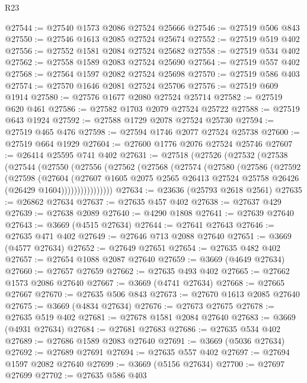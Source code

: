 \begin{lexlean}{R23}
\begin{coremodule}
@27544 := @27540 @1573 @2086 @27524 @25666
@27546 := @27519 @506 @843
@27550 := @27546 @1613 @2085 @27524 @25674
@27552 := @27519 @519 @402
@27556 := @27552 @1581 @2084 @27524 @25682
@27558 := @27519 @534 @402
@27562 := @27558 @1589 @2083 @27524 @25690
@27564 := @27519 @557 @402
@27568 := @27564 @1597 @2082 @27524 @25698
@27570 := @27519 @586 @403
@27574 := @27570 @1646 @2081 @27524 @25706
@27576 := @27519 @609 @1914
@27580 := @27576 @1677 @2080 @27524 @25714
@27582 := @27519 @620 @461
@27586 := @27582 @1703 @2079 @27524 @25722
@27588 := @27519 @643 @1924
@27592 := @27588 @1729 @2078 @27524 @25730
@27594 := @27519 @465 @476
@27598 := @27594 @1746 @2077 @27524 @25738
@27600 := @27519 @664 @1929
@27604 := @27600 @1776 @2076 @27524 @25746
@27607 := @26414 @25595 @741 @402
@27631 := @27518
    (@27526
      (@27532
        (@27538
          (@27544
            (@27550
              (@27556
                (@27562
                  (@27568
                    (@27574
                      (@27580
                        (@27586
                          (@27592
                            (@27598
                              (@27604
                                (@27607
                                  @1605
                                  @2075
                                  @2565
                                  @26413
                                  @27524
                                  @25758
                                  @26426
                                  (@26429 @1604))))))))))))))))
@27634 := @23636 (@25793 @2618 @2561)
@27635 := @26862 @27634
@27637 := @27635 @457 @402
@27638 := @27637 @429
@27639 := @27638 @2089
@27640 := @4290 @1808
@27641 := @27639 @27640
@27643 := @3669 (@4515 @27634)
@27644 := @27641 @27643
@27646 := @27635 @471 @402
@27649 := @27646 @713 @2088 @27640
@27651 := @3669 (@4577 @27634)
@27652 := @27649 @27651
@27654 := @27635 @482 @402
@27657 := @27654 @1088 @2087 @27640
@27659 := @3669 (@4649 @27634)
@27660 := @27657 @27659
@27662 := @27635 @493 @402
@27665 := @27662 @1573 @2086 @27640
@27667 := @3669 (@4741 @27634)
@27668 := @27665 @27667
@27670 := @27635 @506 @843
@27673 := @27670 @1613 @2085 @27640
@27675 := @3669 (@4834 @27634)
@27676 := @27673 @27675
@27678 := @27635 @519 @402
@27681 := @27678 @1581 @2084 @27640
@27683 := @3669 (@4931 @27634)
@27684 := @27681 @27683
@27686 := @27635 @534 @402
@27689 := @27686 @1589 @2083 @27640
@27691 := @3669 (@5036 @27634)
@27692 := @27689 @27691
@27694 := @27635 @557 @402
@27697 := @27694 @1597 @2082 @27640
@27699 := @3669 (@5156 @27634)
@27700 := @27697 @27699
@27702 := @27635 @586 @403

\end{coremodule}
\end{lexlean}

